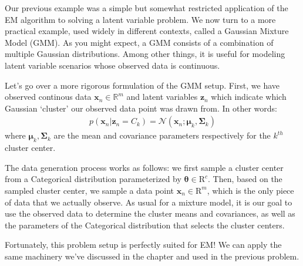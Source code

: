 Our previous example was a simple but somewhat restricted application of the EM algorithm to solving a latent variable problem. We now turn to a more practical example, used widely in different contexts, called a Gaussian Mixture Model (GMM). As you might expect, a GMM consists of a combination of multiple Gaussian distributions. Among other things, it is useful for modeling latent variable scenarios whose observed data is continuous.

Let's go over a more rigorous formulation of the GMM setup. First, we have observed continous data $\textbf{x}_n \in \mathbb{R}^{m}$ and latent variables $\textbf{z}_n$ which indicate which Gaussian `cluster' our observed data point was drawn from. In other words:
\begin{align*}
    p(\textbf{x}_n | \textbf{z}_n = C_k) = \mathcal{N}(\textbf{x}_n; \boldsymbol{\mu}_k, \boldsymbol{\Sigma}_k)
\end{align*}
where $\boldsymbol{\mu}_k, \boldsymbol{\Sigma}_k$ are the mean and covariance parameters respectively for the $k^{th}$ cluster center.

The data generation process works as follows: we first sample a cluster center from a Categorical distribution parameterized by $\boldsymbol{\theta} \in \mathrm{R}^{c}$. Then, based on the sampled cluster center, we sample a data point $\textbf{x}_n \in \mathrm{R}^{m}$, which is the only piece of data that we actually observe. As usual for a mixture model, it is our goal to use the observed data to determine the cluster means and covariances, as well as the parameters of the Categorical distribution that selects the cluster centers.

Fortunately, this problem setup is perfectly suited for EM! We can apply the same machinery we've discussed in the chapter and used in the previous problem.

